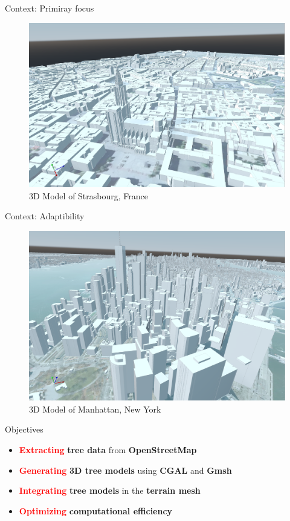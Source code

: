\documentclass[10pt]{beamer}
\begin{document}
\begin{frame}{Context: Primiray focus}
	\begin{figure}
		\centering
		\includegraphics[width=\textwidth]{images/strasbourg-mesh-2.png}
		\caption{3D Model of Strasbourg, France}
		\label{fig:figure1}
	\end{figure}
\end{frame}

\begin{frame}{Context: Adaptibility}
	\begin{figure}
		\centering
		\includegraphics[width=\textwidth]{images/mesh-manhattan-2.png}
		\caption{3D Model of Manhattan, New York}
		\label{fig:figure1}
	\end{figure}
\end{frame}

\begin{frame}{Objectives}
	\Large
	\begin{itemize}
		\item \textbf{\textcolor{red}{Extracting}} \textbf{tree data} from \textbf{OpenStreetMap}
		\item \textbf{\textcolor{red}{Generating}} \textbf{3D tree models} using \textbf{CGAL} and \textbf{Gmsh}
		\item \textbf{\textcolor{red}{Integrating}} \textbf{tree models} in the \textbf{terrain mesh}
		\item \textbf{\textcolor{red}{Optimizing}} \textbf{computational efficiency}
	\end{itemize}
\end{frame}
\end{document}
